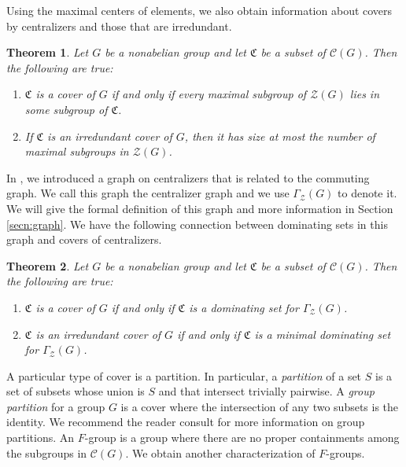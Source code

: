 \documentclass[12pt]{amsart}
\newtheorem{thm}{Theorem}
\begin{document}
{Using the maximal centers of elements, we also obtain information about covers by centralizers and those that are irredundant.

\begin{thm} \label{intro max irredundant}
Let $G$ be a nonabelian group and let $\mathfrak{C}$ be a subset of $\mathcal{C} (G)$.  Then the following are true:
\begin{enumerate}
\item $\mathfrak{C}$ is a cover of $G$ if and only if every maximal subgroup of $\mathcal {Z} (G)$ lies in some subgroup of $\mathfrak {C}$.
\item If $\mathfrak{C}$ is an irredundant cover of $G$, then it has size at most the number of maximal subgroups in $\mathcal{Z} (G)$.
\end{enumerate}
\end{thm}

In \cite{centgraph}, we introduced a graph on centralizers that is related to the commuting graph.  We call this graph the centralizer graph and we use $\Gamma_\mathcal{Z} (G)$ to denote it.  We will give the formal definition of this graph and more information in Section \ref{secn:graph}.  We have the following connection between dominating sets in this graph and covers of centralizers.

\begin{thm} \label{intro dom}
Let $G$ be a nonabelian group and let $\mathfrak{C}$ be a subset of $\mathcal{C}(G)$.  Then the following are true:
\begin{enumerate}
\item $\mathfrak{C}$ is a cover of $G$ if and only if $\mathfrak{C}$ is a dominating set for $\Gamma_{\mathcal Z} (G)$.
\item $\mathfrak{C}$ is an irredundant cover of $G$ if and only if $\mathfrak{C}$ is a minimal dominating set for $\Gamma_{\mathcal Z} (G)$.
\end{enumerate}
\end{thm}

A particular type of cover is a partition.  In particular, a {\it partition} of a set $S$ is a set of subsets whose union is $S$ and that intersect trivially pairwise.  A {\it group partition} for a group $G$ is a cover where the intersection of any two subsets is the identity.   We recommend the reader consult \cite{zappa} for more information on group partitions.  An $F$-group is a group where there are no proper containments among the subgroups in $\mathcal {C} (G)$.  We obtain another characterization of $F$-groups.

}
\end{document}
